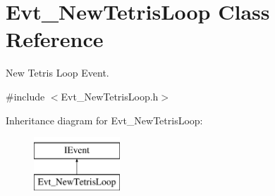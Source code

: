 \hypertarget{classEvt__NewTetrisLoop}{\section{Evt\-\_\-\-New\-Tetris\-Loop Class Reference}
\label{classEvt__NewTetrisLoop}
}


New Tetris Loop Event.  




{\ttfamily \#include $<$Evt\-\_\-\-New\-Tetris\-Loop.\-h$>$}

Inheritance diagram for Evt\-\_\-\-New\-Tetris\-Loop\-:\begin{figure}[H]
\begin{center}
\leavevmode
\includegraphics[height=2.000000cm]{classEvt__NewTetrisLoop}
\end{center}
\end{figure}
